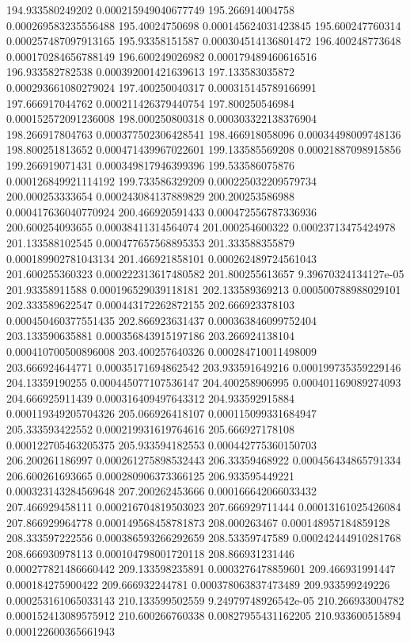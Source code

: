 {194.933580249202 0.000215949040677749
195.266914004758 0.000269583235556488
195.40024750698 0.000145624031423845
195.600247760314 0.000257487097913165
195.93358151587 0.000304514136801472
196.400248773648 0.000170284656788149
196.600249026982 0.000179489460616516
196.933582782538 0.000392001421639613
197.133583035872 0.000293661080279024
197.400250040317 0.000315145789166991
197.666917044762 0.000211426379440754
197.800250546984 0.000152572091236008
198.000250800318 0.000303322138376904
198.266917804763 0.000377502306428541
198.466918058096 0.00034498009748136
198.800251813652 0.000471439967022601
199.133585569208 0.00021887098915856
199.266919071431 0.000349817946399396
199.533586075876 0.000126849921114192
199.733586329209 0.000225032209579734
200.000253333654 0.000243084137889829
200.200253586988 0.000417636040770924
200.466920591433 0.000472556787336936
200.600254093655 0.00038411314564074
201.000254600322 0.00023713475424978
201.133588102545 0.000477657568895353
201.333588355879 0.000189902781043134
201.466921858101 0.000262489724561043
201.600255360323 0.000222313617480582
201.800255613657 9.39670324134127e-05
201.93358911588 0.000196529039118181
202.133589369213 0.000500788988029101
202.333589622547 0.000443172262872155
202.666923378103 0.000450460377551435
202.866923631437 0.000363846099752404
203.133590635881 0.000356843915197186
203.266924138104 0.000410700500896008
203.400257640326 0.000284710011498009
203.666924644771 0.00035171694862542
203.933591649216 0.000199735359229146
204.13359190255 0.000445077107536147
204.400258906995 0.000401169089274093
204.666925911439 0.000316409497643312
204.933592915884 0.000119349205704326
205.066926418107 0.000115099331684947
205.333593422552 0.000219931619764616
205.666927178108 0.000122705463205375
205.933594182553 0.000442775360150703
206.200261186997 0.000261275898532443
206.33359468922 0.000456434865791334
206.600261693665 0.000280906373366125
206.933595449221 0.000323143284569648
207.200262453666 0.000166642066033432
207.466929458111 0.000216704819503023
207.666929711444 0.00013161025426084
207.866929964778 0.000149568458781873
208.000263467 0.000148957184859128
208.333597222556 0.000386593266292659
208.53359747589 0.000242444910281768
208.666930978113 0.000104798001720118
208.866931231446 0.000277821486660442
209.133598235891 0.0003276478859601
209.466931991447 0.000184275900422
209.666932244781 0.000378063837473489
209.933599249226 0.000253161065033143
210.133599502559 9.24979748926542e-05
210.266933004782 0.000152413089575912
210.600266760338 0.00827955431162205
210.933600515894 0.000122600365661943
}

